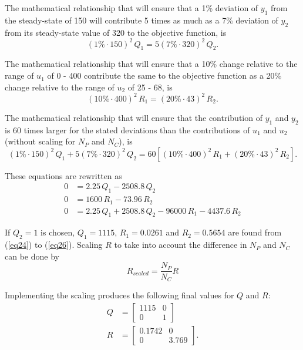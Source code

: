 \documentclass[12pt]{article}
\begin{document}
The mathematical relationship that will ensure that a 1\% deviation of $y_1$ from the steady-state of 150 will contribute 5 times as much as a 7\% deviation of $y_2$ from its steady-state value of 320 to the objective function, is
\begin{equation}
(1\% \cdot 150)^2 \, Q_1 = 5(7\% \cdot 320)^2 \, Q_2.
\end{equation}

The mathematical relationship that will ensure that a 10\% change relative to the range of $u_1$ of 0 - 400 contribute the same to the objective function as a 20\% change relative to the range of $u_2$ of 25 - 68, is
\begin{equation}
(10\% \cdot 400)^2 \, R_1 = (20\% \cdot 43)^2 \, R_2.
\end{equation}

The mathematical relationship that will ensure that the contribution of $y_1$ and $y_2$ is 60 times larger for the stated deviations than the contributions of $u_1$ and $u_2$ (without scaling for $N_P$ and $N_C$), is
\begin{equation}
(1\% \cdot 150)^2 \, Q_1 + 5(7\% \cdot 320)^2 \, Q_2 = 60[(10\% \cdot 400)^2 \, R_1 + (20\% \cdot 43)^2 \, R_2].
\end{equation}

These equations are rewritten as
\begin{align}
0 &= 2.25 \, Q_1 - 2508.8 \, Q_2 \label{eq24}\\
0 &= 1600 \, R_1 - 73.96 \, R_2 \\
0 &= 2.25 \, Q_1 + 2508.8 \, Q_2 - 96000 \, R_1 - 4437.6 \, R_2 \label{eq26}
\end{align}

If $Q_2=1$ is chosen, $Q_1=1115$, $R_1=0.0261$ and $R_2=0.5654$ are found from (\ref{eq24}) to (\ref{eq26}). Scaling $R$ to take into account the difference in $N_P$ and $N_C$ can be done by
\begin{equation}
R_{scaled} = \frac{N_P}{N_C} R
\end{equation}

Implementing the scaling produces the following final values for $Q$ and $R$:
\begin{align*}
Q &=
\begin{bmatrix}
1115 & 0 \\
0 & 1
\end{bmatrix} \\[0.5ex]
R &=
\begin{bmatrix}
0.1742 & 0 \\
0 & 3.769
\end{bmatrix}.
\end{align*}
\end{document}
